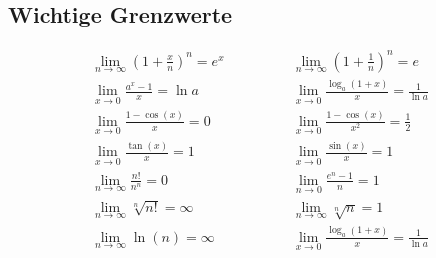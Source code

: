 \subsection{Wichtige Grenzwerte}

\begin{equation*}
\begin{split}
\lim\limits_{n \to \infty} \left( 1+\frac{x}{n} \right)^n = e^x \qquad & \qquad \lim\limits_{n \to \infty} \left( 1+\frac{1}{n} \right)^n = e \\
\lim\limits_{x \to 0} \frac{a^x-1}{x} = \ln a \qquad & \qquad \lim\limits_{x \to 0} \frac{\log_a(1+x)}{x} = \frac{1}{\ln a} \\
\lim\limits_{x \to 0} \frac{1-\cos(x)}{x} = 0 \quad \qquad & \qquad \lim\limits_{x \to 0} \frac{1-\cos(x)}{x^2} = \frac{1}{2} \\
\lim\limits_{x \to 0} \frac{\tan(x)}{x} = 1 \qquad & \qquad \lim\limits_{x \to 0} \frac{\sin(x)}{x} = 1 \\
\lim\limits_{n \to \infty} \frac{n!}{n^n} = 0 \qquad & \qquad \lim\limits_{n \to 0} \frac{e^n -1 }{n} = 1 \\
\lim\limits_{n \to \infty} \sqrt[n]{n!} = \infty \qquad & \qquad \lim\limits_{n \to \infty} \sqrt[n]{n} = 1 \\
\lim\limits_{n \to \infty} \ln(n) = \infty \qquad & \qquad \lim\limits_{x \to 0} \frac{\log_a(1+x)}{x} = \frac{1}{\ln a} \\
\end{split}
\end{equation*}
